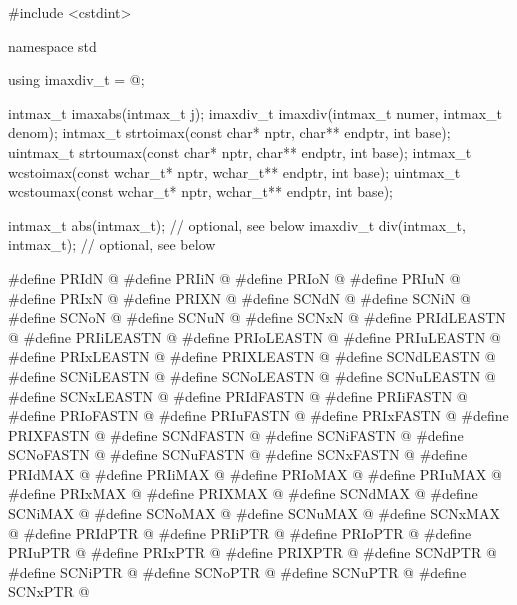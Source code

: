%
%
%
%
%
%
%
%
\begin{codeblock}
#include <cstdint>

namespace std {
  using imaxdiv_t = @\seebelow@;

  intmax_t imaxabs(intmax_t j);
  imaxdiv_t imaxdiv(intmax_t numer, intmax_t denom);
  intmax_t strtoimax(const char* nptr, char** endptr, int base);
  uintmax_t strtoumax(const char* nptr, char** endptr, int base);
  intmax_t wcstoimax(const wchar_t* nptr, wchar_t** endptr, int base);
  uintmax_t wcstoumax(const wchar_t* nptr, wchar_t** endptr, int base);

  intmax_t abs(intmax_t);  // optional, see below
  imaxdiv_t div(intmax_t, intmax_t);  // optional, see below
}

#define PRIdN @\seebelow@
#define PRIiN @\seebelow@
#define PRIoN @\seebelow@
#define PRIuN @\seebelow@
#define PRIxN @\seebelow@
#define PRIXN @\seebelow@
#define SCNdN @\seebelow@
#define SCNiN @\seebelow@
#define SCNoN @\seebelow@
#define SCNuN @\seebelow@
#define SCNxN @\seebelow@ 
#define PRIdLEASTN @\seebelow@
#define PRIiLEASTN @\seebelow@
#define PRIoLEASTN @\seebelow@
#define PRIuLEASTN @\seebelow@
#define PRIxLEASTN @\seebelow@
#define PRIXLEASTN @\seebelow@
#define SCNdLEASTN @\seebelow@
#define SCNiLEASTN @\seebelow@
#define SCNoLEASTN @\seebelow@
#define SCNuLEASTN @\seebelow@
#define SCNxLEASTN @\seebelow@ 
#define PRIdFASTN @\seebelow@
#define PRIiFASTN @\seebelow@
#define PRIoFASTN @\seebelow@
#define PRIuFASTN @\seebelow@
#define PRIxFASTN @\seebelow@
#define PRIXFASTN @\seebelow@
#define SCNdFASTN @\seebelow@
#define SCNiFASTN @\seebelow@
#define SCNoFASTN @\seebelow@
#define SCNuFASTN @\seebelow@
#define SCNxFASTN @\seebelow@ 
#define PRIdMAX @\seebelow@
#define PRIiMAX @\seebelow@
#define PRIoMAX @\seebelow@
#define PRIuMAX @\seebelow@
#define PRIxMAX @\seebelow@
#define PRIXMAX @\seebelow@
#define SCNdMAX @\seebelow@
#define SCNiMAX @\seebelow@
#define SCNoMAX @\seebelow@
#define SCNuMAX @\seebelow@
#define SCNxMAX @\seebelow@ 
#define PRIdPTR @\seebelow@
#define PRIiPTR @\seebelow@
#define PRIoPTR @\seebelow@
#define PRIuPTR @\seebelow@
#define PRIxPTR @\seebelow@
#define PRIXPTR @\seebelow@
#define SCNdPTR @\seebelow@
#define SCNiPTR @\seebelow@
#define SCNoPTR @\seebelow@
#define SCNuPTR @\seebelow@
#define SCNxPTR @\seebelow@
\end{codeblock}

